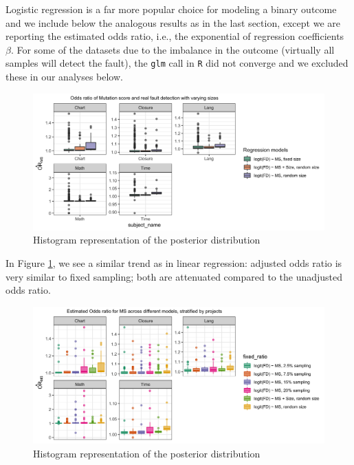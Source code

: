 \documentclass[10pt,letterpaper]{article}
\begin{document}
Logistic regression is a far more popular choice for modeling a binary outcome and we include below the analogous results as in the last section, except we are reporting the estimated odds ratio, i.e., the exponential of regression coefficients $\beta$. For some of the datasets due to the imbalance in the outcome (virtually all samples will detect the fault), the \texttt{glm} call in \texttt{R} did not converge and we excluded these in our analyses below.

\begin{figure}[ht!]
        \centering
        \includegraphics[scale=0.15]{figures/beta_OR_size.png}
        \caption{Histogram representation of the posterior distribution}
        \label{fig:beta_OR_size}
    \end{figure}
    
In  Figure \ref{fig:beta_OR_size}, we see a similar trend as in linear regression: adjusted odds ratio is very similar to fixed sampling; both are attenuated compared to the unadjusted odds ratio.

  \begin{figure}[ht!]
        \centering
        \includegraphics[scale=0.15]{figures/stratified_OR_coef_size.png}
        \caption{Histogram representation of the posterior distribution}
        \label{fig:stratified_OR_coef_size}
    \end{figure}
    
\end{document}
